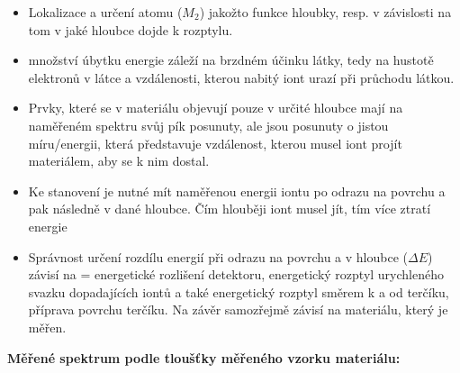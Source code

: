 \begin{itemize}
    \item Lokalizace a určení atomu ($M_2$) jakožto funkce hloubky, resp. v závislosti na tom v jaké hloubce dojde k rozptylu.
    \item množství úbytku energie záleží na brzdném účinku látky, tedy na hustotě elektronů v látce a vzdálenosti, kterou nabitý iont urazí při průchodu látkou.
    \item Prvky, které se v materiálu objevují pouze v určité hloubce mají na naměřeném spektru svůj pík posunuty, ale jsou posunuty o jistou míru/energii, která představuje vzdálenost, kterou musel iont projít materiálem, aby se k nim dostal.
    \item Ke stanovení je nutné mít naměřenou energii iontu po odrazu na povrchu a pak následně v dané hloubce. Čím hlouběji iont musel jít, tím více ztratí energie
    \item Správnost určení rozdílu energií při odrazu na povrchu a v hloubce ($\Delta E$) závisí na = energetické rozlišení detektoru, energetický rozptyl urychleného svazku dopadajících iontů a také energetický rozptyl směrem k a od terčíku, příprava povrchu terčíku. Na závěr samozřejmě závisí na materiálu, který je měřen.
\end{itemize}

\textbf{Měřené spektrum podle tloušťky měřeného vzorku materiálu:}

